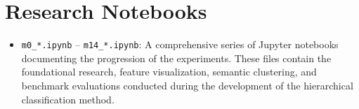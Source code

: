 \documentclass[oneside]{ctuthesis}
\begin{document}
\section*{Research Notebooks}
\begin{itemize}
    \item \texttt{m0\_*.ipynb} -- \texttt{m14\_*.ipynb}: A comprehensive series of Jupyter notebooks documenting the progression of the experiments. These files contain the foundational research, feature visualization, semantic clustering, and benchmark evaluations conducted during the development of the hierarchical classification method.
\end{itemize}
\end{document}
